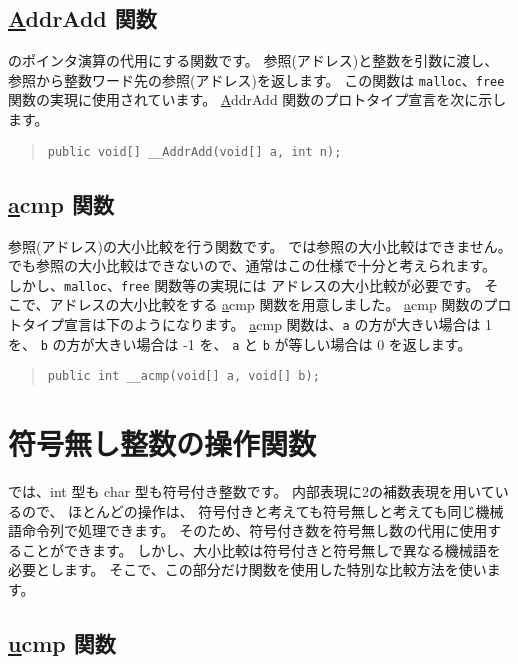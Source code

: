 \subsection{\ul \ul AddrAdd 関数}

\cl のポインタ演算の代用にする関数です。
参照(アドレス)と整数を引数に渡し、
参照から整数ワード先の参照(アドレス)を返します。
この関数は \verb/malloc/、\verb/free/ 関数の実現に使用されています。
\ul \ul AddrAdd 関数のプロトタイプ宣言を次に示します。

\begin{quote}
\begin{verbatim}
public void[] __AddrAdd(void[] a, int n);
\end{verbatim}
\end{quote}

\subsection{\ul \ul acmp 関数}

参照(アドレス)の大小比較を行う関数です。
\cmml では参照の大小比較はできません。
\javal でも参照の大小比較はできないので、通常はこの仕様で十分と考えられます。
しかし、\verb/malloc/、\verb/free/ 関数等の実現には
アドレスの大小比較が必要です。
そこで、アドレスの大小比較をする \ul \ul acmp 関数を用意しました。
\ul \ul acmp 関数のプロトタイプ宣言は下のようになります。
\ul \ul acmp 関数は、\verb/a/ の方が大きい場合は 1 を、
\verb/b/ の方が大きい場合は -1 を、
\verb/a/ と \verb/b/ が等しい場合は 0 を返します。

\begin{quote}
\begin{verbatim}
public int __acmp(void[] a, void[] b);
\end{verbatim}
\end{quote}

\section{符号無し整数の操作関数}

\cmml では、int 型も char 型も符号付き整数です。
内部表現に2の補数表現を用いているので、
ほとんどの操作は、
符号付きと考えても符号無しと考えても同じ機械語命令列で処理できます。
そのため、符号付き数を符号無し数の代用に使用することができます。
しかし、大小比較は符号付きと符号無しで異なる機械語を必要とします。
そこで、この部分だけ関数を使用した特別な比較方法を使います。

\subsection{\ul \ul ucmp 関数}

